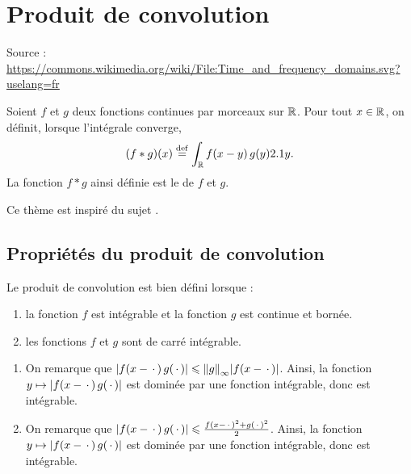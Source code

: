 \section{Produit de convolution} 


\begin{marginfigure}[0cm]
    \centering
    
    \caption{Source : \url{https://commons.wikimedia.org/wiki/File:Time_and_frequency_domains.svg?uselang=fr}}
\end{marginfigure}

\begin{defi}
Soient $f$ et $g$ deux fonctions continues par morceaux sur $\mathbb{R}$. Pour tout $x \in \mathbb{R}$, on définit, lorsque l'intégrale converge,
\begin{equation}\label{defconvolution}
(f \ast g)(x) \overset{\mathrm{\tiny def}}{=} \int_{\mathbb{R}} f(x-y) \, g(y) 2.1 y.
\end{equation}
La fonction $f \ast g$ ainsi définie est le  de $f$ et $g$.
\end{defi}

Ce thème est inspiré du sujet \cite{cs_1_2012}.

\subsection{Propriétés du produit de convolution}

\begin{theo}
Le produit de convolution est bien défini lorsque :
\begin{enumerate}
\item la fonction $f$ est intégrable et la fonction $g$ est continue et bornée.

\item les fonctions $f$ et $g$ sont de carré intégrable.
\end{enumerate}
\end{theo}

\begin{demo}
\begin{enumerate}
\item On remarque que $\mathopen{}\left| f(x - \,\cdot\,) \, g(\,\cdot\,) \right| \leqslant \norm{g}_\infty \mathopen{}\left| f(x - \,\cdot\,) \right|$. Ainsi, la fonction $y \mapsto \mathopen{}\left| f(x - \,\cdot\,) \, g(\,\cdot\,) \right|$ est dominée par une fonction intégrable, donc est intégrable.

\item On remarque que $\mathopen{}\left| f(x - \,\cdot\,) \, g(\,\cdot\,) \right| \leqslant \frac{f(x - \,\cdot\,)^2 + g(\,\cdot\,)^2}{2}$. Ainsi, la fonction $y \mapsto \mathopen{}\left| f(x - \,\cdot\,) \, g(\,\cdot\,) \right|$ est dominée par une fonction intégrable, donc est intégrable.
\end{enumerate}
\end{demo}

